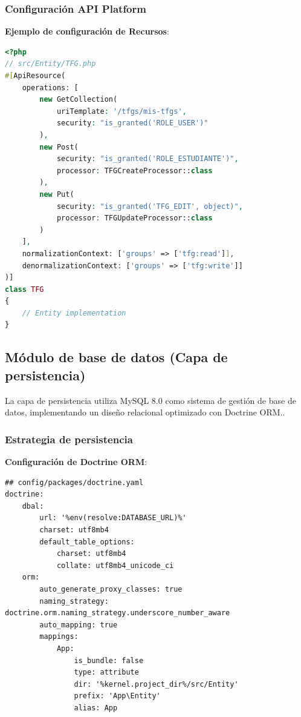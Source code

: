 \documentclass[12pt,a4paper,oneside]{report}
\begin{document}
\subsubsection{Configuración API
Platform}\label{configuraciuxf3n-api-platform}

\textbf{Ejemplo de configuración de Recursos}:

\begin{lstlisting}[language=PHP]
<?php
// src/Entity/TFG.php
#[ApiResource(
    operations: [
        new GetCollection(
            uriTemplate: '/tfgs/mis-tfgs',
            security: "is_granted('ROLE_USER')"
        ),
        new Post(
            security: "is_granted('ROLE_ESTUDIANTE')",
            processor: TFGCreateProcessor::class
        ),
        new Put(
            security: "is_granted('TFG_EDIT', object)",
            processor: TFGUpdateProcessor::class
        )
    ],
    normalizationContext: ['groups' => ['tfg:read']],
    denormalizationContext: ['groups' => ['tfg:write']]
)]
class TFG
{
    // Entity implementation
}
\end{lstlisting}

\subsection{Módulo de base de datos (Capa de
persistencia)}\label{muxf3dulo-de-base-de-datos-capa-de-persistencia}

La capa de persistencia utiliza MySQL 8.0 como sistema de gestión de
base de datos, implementando un diseño relacional optimizado con
Doctrine ORM..

\subsubsection{Estrategia de
persistencia}\label{estrategia-de-persistencia}

\textbf{Configuración de Doctrine ORM}:

\begin{lstlisting}
## config/packages/doctrine.yaml
doctrine:
    dbal:
        url: '%env(resolve:DATABASE_URL)%'
        charset: utf8mb4
        default_table_options:
            charset: utf8mb4
            collate: utf8mb4_unicode_ci
    orm:
        auto_generate_proxy_classes: true
        naming_strategy: doctrine.orm.naming_strategy.underscore_number_aware
        auto_mapping: true
        mappings:
            App:
                is_bundle: false
                type: attribute
                dir: '%kernel.project_dir%/src/Entity'
                prefix: 'App\Entity'
                alias: App
\end{lstlisting}
\end{document}

